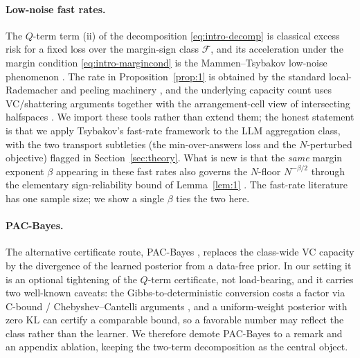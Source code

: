 \documentclass{article} %
\providecommand{\Fcal}{\mathcal{F}}
\begin{document}
\paragraph{Low-noise fast rates.}
The $Q$-term term (ii) of the decomposition \eqref{eq:intro-decomp} is
classical excess risk for a fixed loss over the margin-sign class $\Fcal$, and its
acceleration under the margin condition \eqref{eq:intro-margincond} is the
Mammen--Tsybakov low-noise phenomenon
\citep{mammen1999smooth,tsybakov2004optimal,tsybakov2009introduction}. The rate
in Proposition~\ref{prop:1} is obtained by the standard local-Rademacher and
peeling machinery
\citep{bartlett2005local,koltchinskii2006local,massart2006risk,bartlett2002rademacher,koltchinskii2001furthereo,audibert2005fastlr},
and the underlying capacity count uses VC/shattering arguments
\citep{vapnik1971uniform,sauer1972density,shelah1972combinatorial,blumer1989learnability}
together with the arrangement-cell view of intersecting halfspaces
\citep{zaslavsky1975facing}. We import these tools rather than extend them; the
honest statement is that we apply Tsybakov's fast-rate framework to the LLM
aggregation class, with the two transport subtleties (the min-over-answers loss
and the $N$-perturbed objective) flagged in Section~\ref{sec:theory}. What is new
is that the \emph{same} margin exponent $\beta$ appearing in these fast rates also
governs the $N$-floor $N^{-\beta/2}$ through the elementary sign-reliability bound
of Lemma~\ref{lem:1} \citep{hoeffding1963probability}. The fast-rate literature
has one sample size; we show a single $\beta$ ties the two here.

\paragraph{PAC-Bayes.}
The alternative certificate route, PAC-Bayes
\citep{mcallester1999pacbayes,dziugaite2017computing}, replaces the class-wide VC
capacity by the divergence of the learned posterior from a data-free prior. In our
setting it is an optional tightening of the $Q$-term certificate, not
load-bearing, and it carries two well-known caveats: the Gibbs-to-deterministic
conversion costs a factor via C-bound / Chebyshev--Cantelli arguments
\citep{viallard2021selfboundingmv,wu2021chebyshevcantellipi}, and a uniform-weight
posterior with zero KL can certify a comparable bound, so a favorable number may
reflect the class rather than the learner. We therefore demote PAC-Bayes to a
remark and an appendix ablation, keeping the two-term decomposition as the
central object.
\end{document}
